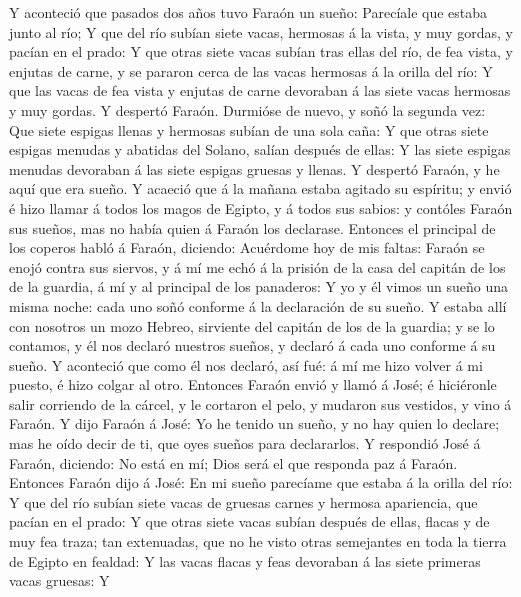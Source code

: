  Y aconteció que pasados dos años tuvo Faraón un sueño:
Parecíale que estaba junto al río;  Y que del río subían
siete vacas, hermosas á la vista, y muy gordas, y pacían en el prado:
 Y que otras siete vacas subían tras ellas del río, de fea
vista, y enjutas de carne, y se pararon cerca de las vacas hermosas á la
orilla del río:  Y que las vacas de fea vista y enjutas de
carne devoraban á las siete vacas hermosas y muy gordas. Y despertó
Faraón.  Durmióse de nuevo, y soñó la segunda vez: Que siete
espigas llenas y hermosas subían de una sola caña:  Y que
otras siete espigas menudas y abatidas del Solano, salían después de
ellas:  Y las siete espigas menudas devoraban á las siete
espigas gruesas y llenas. Y despertó Faraón, y he aquí que era sueño.
 Y acaeció que á la mañana estaba agitado su espíritu; y
envió é hizo llamar á todos los magos de Egipto, y á todos sus sabios: y
contóles Faraón sus sueños, mas no había quien á Faraón los declarase.
 Entonces el principal de los coperos habló á Faraón,
diciendo: Acuérdome hoy de mis faltas:  Faraón se enojó
contra sus siervos, y á mí me echó á la prisión de la casa del capitán
de los de la guardia, á mí y al principal de los panaderos:
 Y yo y él vimos un sueño una misma noche: cada uno soñó
conforme á la declaración de su sueño.  Y estaba allí con
nosotros un mozo Hebreo, sirviente del capitán de los de la guardia; y
se lo contamos, y él nos declaró nuestros sueños, y declaró á cada uno
conforme á su sueño.  Y aconteció que como él nos declaró,
así fué: á mí me hizo volver á mi puesto, é hizo colgar al otro.
 Entonces Faraón envió y llamó á José; é hiciéronle salir
corriendo de la cárcel, y le cortaron el pelo, y mudaron sus vestidos, y
vino á Faraón.  Y dijo Faraón á José: Yo he tenido un
sueño, y no hay quien lo declare; mas he oído decir de ti, que oyes
sueños para declararlos.  Y respondió José á Faraón,
diciendo: No está en mí; Dios será el que responda paz á Faraón.
 Entonces Faraón dijo á José: En mi sueño parecíame que
estaba á la orilla del río:  Y que del río subían siete
vacas de gruesas carnes y hermosa apariencia, que pacían en el prado:
 Y que otras siete vacas subían después de ellas, flacas y
de muy fea traza; tan extenuadas, que no he visto otras semejantes en
toda la tierra de Egipto en fealdad:  Y las vacas flacas y
feas devoraban á las siete primeras vacas gruesas:  Y
